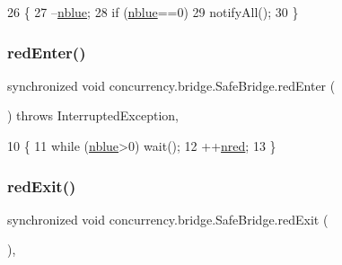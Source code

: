 \begin{DoxyCode}
26                                 \{
27         --\mbox{\hyperlink{classconcurrency_1_1bridge_1_1_safe_bridge_ac3f25c616210ab4cc7af4882a0145ae6}{nblue}};
28         \textcolor{keywordflow}{if} (\mbox{\hyperlink{classconcurrency_1_1bridge_1_1_safe_bridge_ac3f25c616210ab4cc7af4882a0145ae6}{nblue}}==0)
29             notifyAll();
30     \}
\end{DoxyCode}
\mbox{\label{classconcurrency_1_1bridge_1_1_safe_bridge_a291e117cad1bc432528de5622a0f77f3}} 
\subsubsection{\texorpdfstring{red\+Enter()}{redEnter()}}
{\footnotesize\ttfamily synchronized void concurrency.\+bridge.\+Safe\+Bridge.\+red\+Enter (\begin{DoxyParamCaption}{ }\end{DoxyParamCaption}) throws Interrupted\+Exception\hspace{0.3cm}{\ttfamily [inline]}, {\ttfamily [package]}}


\begin{DoxyCode}
10                                                              \{
11         \textcolor{keywordflow}{while} (\mbox{\hyperlink{classconcurrency_1_1bridge_1_1_safe_bridge_ac3f25c616210ab4cc7af4882a0145ae6}{nblue}}>0) wait();
12         ++\mbox{\hyperlink{classconcurrency_1_1bridge_1_1_safe_bridge_aa2abb2203b25978e240bb355a84ae5fc}{nred}};
13     \}
\end{DoxyCode}
\mbox{\label{classconcurrency_1_1bridge_1_1_safe_bridge_a55f78f015ba654a529d3a4cf71e49261}} 
\subsubsection{\texorpdfstring{red\+Exit()}{redExit()}}
{\footnotesize\ttfamily synchronized void concurrency.\+bridge.\+Safe\+Bridge.\+red\+Exit (\begin{DoxyParamCaption}{ }\end{DoxyParamCaption})\hspace{0.3cm}{\ttfamily [inline]}, {\ttfamily [package]}}


